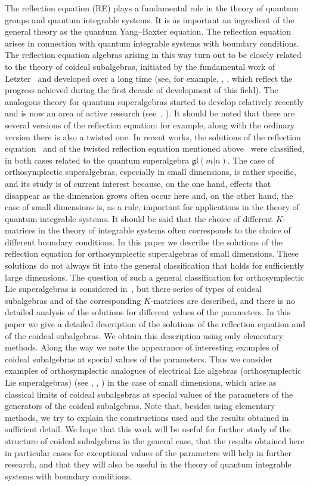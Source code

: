 \documentclass[12pt,a4paper]{article}
\begin{document}
The reflection equation (RE) plays a fundamental role in the theory of quantum groups and quantum integrable systems. It is as important an ingredient of the general theory as the quantum Yang--Baxter equation. The reflection equation arises in connection with quantum integrable systems with boundary conditions. The reflection equation algebras arising in this way turn out to be closely related to the theory of coideal subalgebras, initiated by the fundamental work of Letzter~\cite{L} and developed over a long time (see, for example, \cite{K}, \cite{K1}, which reflect the progress achieved during the first decade of development of this field). The analogous theory for quantum superalgebras started to develop relatively recently and is now an area of active research (see~\cite{AMS}, \cite{SW}). It should be noted that there are several versions of the reflection equation: for example, along with the ordinary version there is also a twisted one. In recent works, the solutions of the reflection equation~\cite{AMS1} and of the twisted reflection equation mentioned above~\cite{AM} were classified, in both cases related to the quantum superalgebra $\mathfrak{gl}(m|n)$. The case of orthosymplectic superalgebras, especially in small dimensions, is rather specific, and its study is of current interest because, on the one hand, effects that disappear as the dimension grows often occur here and, on the other hand, the case of small dimensions is, as a rule, important for applications in the theory of quantum integrable systems. It should be said that the choice of different $K$-matrices in the theory of integrable systems often corresponds to the choice of different boundary conditions. In this paper we describe the solutions of the reflection equation for orthosymplectic superalgebras of small dimensions. These solutions do not always fit into the general classification that holds for sufficiently large dimensions. The question of such a general classification for orthosymplectic Lie superalgebras is considered in~\cite{AMS}, but there series of types of coideal subalgebras and of the corresponding $K$-matrices are described, and there is no detailed analysis of the solutions for different values of the parameters. In this paper we give a detailed description of the solutions of the reflection equation and of the coideal subalgebras. We obtain this description using only elementary methods. Along the way we note the appearance of interesting examples of coideal subalgebras at special values of the parameters. Thus we consider examples of orthosymplectic analogues of electrical Lie algebras (orthosymplectic Lie superalgebras) (see \cite{AMS2}, \cite{LP}, \cite{BGG}) in the case of small dimensions, which arise as classical limits of coideal subalgebras at special values of the parameters of the generators of the coideal subalgebras. Note that, besides using elementary methods, we try to explain the constructions used and the results obtained in sufficient detail. We hope that this work will be useful for further study of the structure of coideal subalgebras in the general case, that the results obtained here in particular cases for exceptional values of the parameters will help in further research, and that they will also be useful in the theory of quantum integrable systems with boundary conditions.
\end{document}
